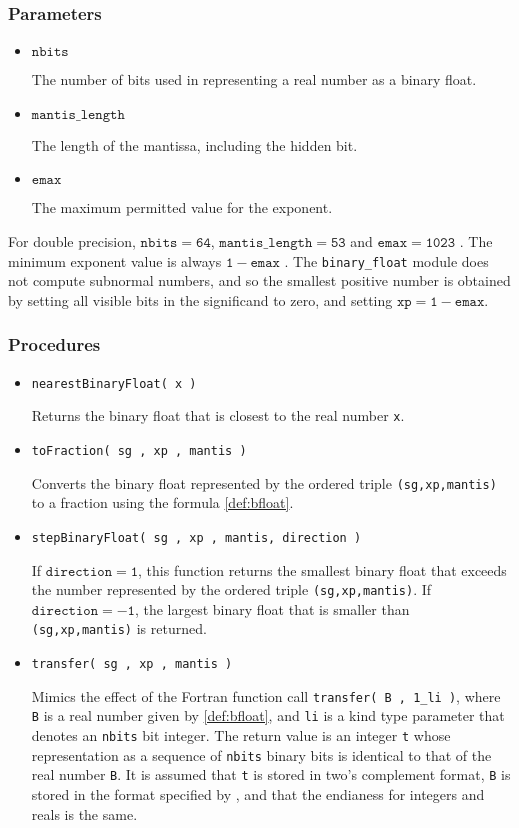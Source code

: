 \documentclass[paper=a4,smallheadings]{scrartcl}
\newcommand\iitem[1]{\item \texttt{#1} \par}
\begin{document}
\subsubsection*{Parameters}
\begin{itemize}
\item $\mathtt{nbits}$ \par
The number of bits used in representing a real number as a binary float.
\item $\mathtt{mantis\_length}$ \par
The length of the mantissa, including the hidden bit.
\item $\mathtt{emax}$ \par
The maximum permitted value for the exponent.
\end{itemize}
For double precision, $\mathtt{nbits=64}$,
$\mathtt{mantis\_length=53}$ and $\mathtt{emax=1023}$ \cite{IEEE754}.
The minimum exponent value is always $\mathtt{1-emax}$ \cite{IEEE754}.
The \texttt{binary\_float} module does not compute subnormal numbers,
and so the smallest positive number is obtained by setting all visible
bits in the significand to zero, and setting $\mathtt{xp=1-emax}$.
%
\subsubsection*{Procedures}
\begin{itemize}
\iitem{nearestBinaryFloat( x )} 
Returns the binary float that is closest to the real number \texttt{x}.  
%
\iitem{toFraction( sg , xp , mantis )} 
Converts the binary float represented by the ordered
triple \texttt{(sg,xp,mantis)} to a fraction using the formula
\eqref{def:bfloat}.
%
\iitem{stepBinaryFloat( sg , xp , mantis, direction )}
If $\mathtt{direction=1}$, this function returns the
smallest binary float that exceeds the number represented by
the ordered triple \texttt{(sg,xp,mantis)}.
If $\mathtt{direction=-1}$, the largest binary float that is smaller
than \texttt{(sg,xp,mantis)} is returned.
%
\iitem{transfer( sg , xp , mantis )} Mimics the effect of the Fortran
function call \texttt{transfer( B , 1\_li )}, where \texttt{B} is a
real number given by \eqref{def:bfloat}, and \texttt{li} is a kind
type parameter that denotes an \texttt{nbits} bit integer.  The
return value is an integer \texttt{t} whose representation as a
sequence of \texttt{nbits} binary bits is identical to that of the
real number \texttt{B}. It is assumed that \texttt{t} is stored in
two's complement format, \texttt{B} is stored in the format specified
by \cite{IEEE754}, and that the endianess for integers and reals is
the same.
\end{itemize}
%
\end{document}
